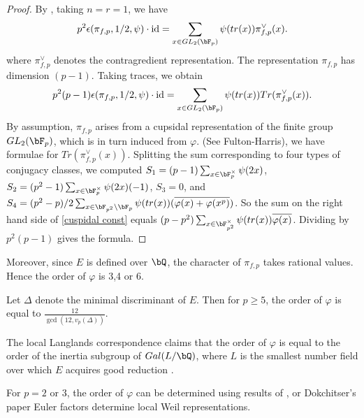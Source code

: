 \documentclass [11pt, proquest] {uwthesis}[2015/03/03]
\begin{document}
\begin{proof}
By \cite{bushnell2006local}, taking $n =  r = 1$, we have 
\begin{equation} 
	p^2 \epsilon(\pi_{f,p}, 1/2, \psi) \cdot \text{id} = \sum_{x \in GL_2(\bF_p)} \psi(tr(x)) \pi_{f,p}^{\vee}(x).
\end{equation}
where $\pi_{f,p}^{\vee}$ denotes the contragredient representation. The representation $\pi_{f,p}$ has dimension $(p-1)$.
Taking traces, we obtain 
\begin{equation} \label{cuspidal const}
	p^2 (p-1) \epsilon(\pi_{f,p}, 1/2, \psi) \cdot \text{id} = \sum_{x \in GL_2(\bF_p)} \psi(tr(x)) Tr(\pi_{f,p}^{\vee}(x)).
\end{equation}
By assumption, $\pi_{f,p}$ arises from a cupsidal representation of the finite group $GL_2(\bF_p)$, which is in turn induced from $\varphi$. (See Fulton-Harris), we have formulae for $Tr(\pi_{f,p}^{\vee}(x))$. Splitting the sum corresponding to four types of conjugacy classes, we computed $S_1 =  (p-1)  \sum_{x \in \bF_p^{\times}} \psi(2x)$, $S_2 = (p^2-1) \sum_{x \in \bF_p^{\times}} \psi(2x) (-1)$, $S_3 = 0$, and $S_4=  (p^2-p)/2 \sum_{x \in \bF_{p^2} \setminus \bF_p} \psi(tr(x))(\overline{\varphi(x) + \varphi(x^p)})$. So the sum on the right hand side of \ref{cuspidal const}  equals $(p-p^2) \sum_{x \in \bF_{p^2}^{\times}} \psi(tr(x)) \overline{\varphi(x)}$. Dividing by $p^2(p-1)$ gives the formula.

\end{proof}

Moreover, since $E$ is defined over $\bQ$, the character of $\pi_{f,p}$ takes rational values. Hence the order of $\varphi$ is 3,4 or 6. 

\begin{Lemma}
Let $\Delta$ denote the minimal discriminant of $E$. Then for $p \geq 5$, the order of $\varphi$ is equal to 
$\frac{12}{\gcd(12, v_p(\Delta))}$.
\end{Lemma}

The local Langlands correspondence claims that the order of $\varphi$ is equal to the order of the inertia subgroup 
of $Gal(L/\bQ)$, where $L$ is the smallest number field over which $E$ acquires good reduction .

For $p = 2$ or $3$, the order of $\varphi$ can be determined using results of \cite{kraus1990defaut}, or Dokchitser's paper Euler factors determine local Weil representations. \cite{loeffler2010computation}
\end{document}
